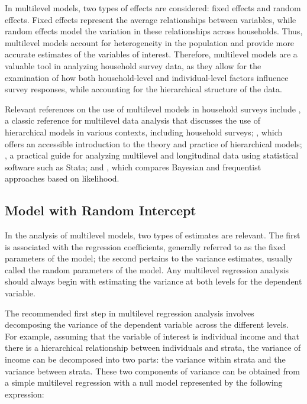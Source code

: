\documentclass[
  12pt,
]{book}
\begin{document}
In multilevel models, two types of effects are considered: fixed effects and random effects. Fixed effects represent the average relationships between variables, while random effects model the variation in these relationships across households. Thus, multilevel models account for heterogeneity in the population and provide more accurate estimates of the variables of interest. Therefore, multilevel models are a valuable tool in analyzing household survey data, as they allow for the examination of how both household-level and individual-level factors influence survey responses, while accounting for the hierarchical structure of the data.

Relevant references on the use of multilevel models in household surveys include \citet{goldstein2011}, a classic reference for multilevel data analysis that discusses the use of hierarchical models in various contexts, including household surveys; \citet{gelmanhill2019}, which offers an accessible introduction to the theory and practice of hierarchical models; \citet{rabe2012multilevel}, a practical guide for analyzing multilevel and longitudinal data using statistical software such as Stata; and \citet{browne2006comparison}, which compares Bayesian and frequentist approaches based on likelihood.

\hypertarget{model-with-random-intercept}{%
\subsection{Model with Random Intercept}\label{model-with-random-intercept}}

In the analysis of multilevel models, two types of estimates are relevant. The first is associated with the regression coefficients, generally referred to as the fixed parameters of the model; the second pertains to the variance estimates, usually called the random parameters of the model. Any multilevel regression analysis should always begin with estimating the variance at both levels for the dependent variable.

The recommended first step in multilevel regression analysis involves decomposing the variance of the dependent variable across the different levels. For example, assuming that the variable of interest is individual income and that there is a hierarchical relationship between individuals and strata, the variance of income can be decomposed into two parts: the variance within strata and the variance between strata. These two components of variance can be obtained from a simple multilevel regression with a null model represented by the following expression:
\end{document}

